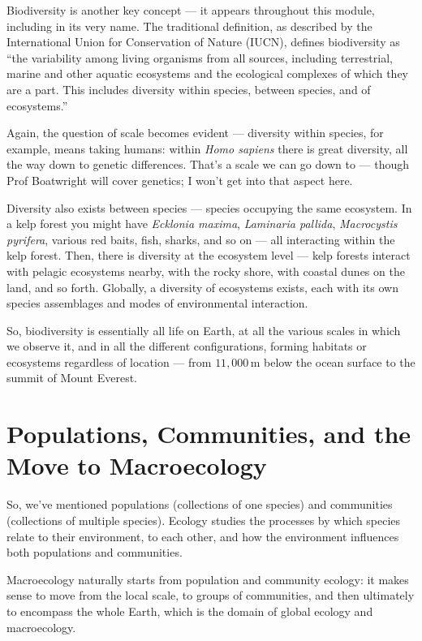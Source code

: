 \documentclass[
  10pt,
]{book}
\begin{document}
Biodiversity is another key concept --- it appears throughout this
module, including in its very name. The traditional definition, as
described by the International Union for Conservation of Nature (IUCN),
defines biodiversity as ``the variability among living organisms from
all sources, including terrestrial, marine and other aquatic ecosystems
and the ecological complexes of which they are a part. This includes
diversity within species, between species, and of ecosystems.''

Again, the question of scale becomes evident --- diversity within
species, for example, means taking humans: within \emph{Homo sapiens}
there is great diversity, all the way down to genetic differences.
That's a scale we can go down to --- though Prof Boatwright will cover
genetics; I won't get into that aspect here.

Diversity also exists between species --- species occupying the same
ecosystem. In a kelp forest you might have \emph{Ecklonia maxima},
\emph{Laminaria pallida}, \emph{Macrocystis pyrifera}, various red
baits, fish, sharks, and so on --- all interacting within the kelp
forest. Then, there is diversity at the ecosystem level --- kelp forests
interact with pelagic ecosystems nearby, with the rocky shore, with
coastal dunes on the land, and so forth. Globally, a diversity of
ecosystems exists, each with its own species assemblages and modes of
environmental interaction.

So, biodiversity is essentially all life on Earth, at all the various
scales in which we observe it, and in all the different configurations,
forming habitats or ecosystems regardless of location --- from
\(11,000\,\mathrm{m}\) below the ocean surface to the summit of Mount
Everest.

\section{Populations, Communities, and the Move to
Macroecology}\label{populations-communities-and-the-move-to-macroecology}

So, we've mentioned populations (collections of one species) and
communities (collections of multiple species). Ecology studies the
processes by which species relate to their environment, to each other,
and how the environment influences both populations and communities.

Macroecology naturally starts from population and community ecology: it
makes sense to move from the local scale, to groups of communities, and
then ultimately to encompass the whole Earth, which is the domain of
global ecology and macroecology.
\end{document}
